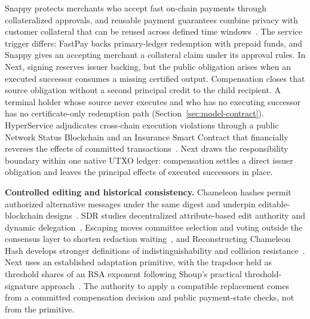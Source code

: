 Snappy protects merchants who accept fast on-chain payments through
collateralized approvals, and reusable payment guarantees combine privacy with
customer collateral that can be reused across defined time
windows~\cite{snappy,reusable}. The service trigger differs: FastPay backs primary-ledger redemption
with prepaid funds, and Snappy gives an accepting merchant a collateral claim
under its approval rules. In Next, signing reserves issuer backing, but the
public obligation arises when an executed successor consumes a missing
certified output. Compensation closes that source obligation without a second
principal credit to the child recipient. A terminal holder whose source never
executes and who has no executing successor has no certificate-only redemption
path (Section~\ref{sec:model-contract}). HyperService adjudicates cross-chain
execution violations through a public Network Status Blockchain and an
Insurance Smart Contract that financially reverses the effects of committed
transactions~\cite{web3}. Next draws the responsibility boundary within one
native UTXO ledger: compensation settles a direct issuer obligation and leaves
the principal effects of executed successors in place.

\noindent\textbf{Controlled editing and historical consistency.}
Chameleon hashes permit authorized alternative messages under the same digest
and underpin editable-blockchain designs~\cite{redactable}. SDR studies
decentralized attribute-based edit authority and dynamic
delegation~\cite{sdr}, Escaping moves committee selection and voting outside
the consensus layer to shorten redaction waiting~\cite{escaping}, and
Reconstructing Chameleon Hash develops stronger definitions of
indistinguishability and collision resistance~\cite{reconstructCH}. Next uses
an established adaptation primitive, with the trapdoor held as threshold
shares of an RSA exponent following Shoup's practical threshold-signature
approach~\cite{shoup}. The authority to apply a compatible replacement comes
from a committed compensation decision and public payment-state checks, not
from the primitive.

